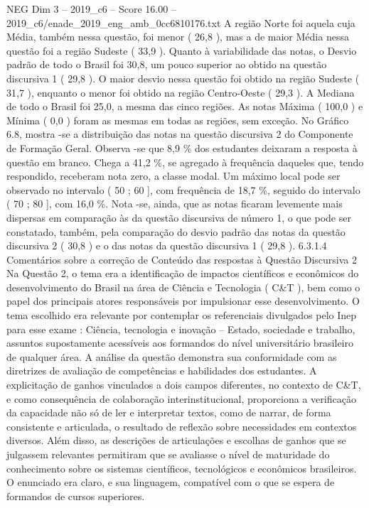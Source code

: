 \begin{textsample}{NEG Dim 3 – 2019\_c6 – Score 16.00 – 2019\_c6/enade\_2019\_eng\_amb\_0cc6810176.txt}
A região Norte foi aquela cuja Média, também nessa questão, foi menor ( 26,8 ), mas a de maior Média nessa questão foi a região Sudeste ( 33,9 ).
Quanto à variabilidade das notas, o Desvio padrão de todo o Brasil foi 30,8, um pouco superior ao obtido na questão discursiva 1 ( 29,8 ).
O maior desvio nessa questão foi obtido na região Sudeste ( 31,7 ), enquanto o menor foi obtido na região Centro-Oeste ( 29,3 ).
A Mediana de todo o Brasil foi 25,0, a mesma das cinco regiões.
As notas Máxima ( 100,0 ) e Mínima ( 0,0 ) foram as mesmas em todas as regiões, sem exceção.
No Gráfico 6.8, mostra -se a distribuição das notas na questão discursiva 2 do Componente de Formação Geral.
Observa -se que 8,9 \% dos estudantes deixaram a resposta à questão em branco.
Chega a 41,2 \%, se agregado à frequência daqueles que, tendo respondido, receberam nota zero, a classe modal.
Um máximo local pode ser observado no intervalo ( 50 ; 60 ], com frequência de 18,7 \%, seguido do intervalo ( 70 ; 80 ], com 16,0 \%.
Nota -se, ainda, que as notas ficaram levemente mais dispersas em comparação às da questão discursiva de número 1, o que pode ser constatado, também, pela comparação do desvio padrão das notas da questão discursiva 2 ( 30,8 ) e o das notas da questão discursiva 1 ( 29,8 ). 6.3.1.4 Comentários sobre a correção de Conteúdo das respostas à Questão Discursiva 2 Na Questão 2, o tema era a identificação de impactos científicos e econômicos do desenvolvimento do Brasil na área de Ciência e Tecnologia ( C\&T ), bem como o papel dos principais atores responsáveis por impulsionar esse desenvolvimento.
O tema escolhido era relevante por contemplar os referenciais divulgados pelo Inep para esse exame : Ciência, tecnologia e inovação – Estado, sociedade e trabalho, assuntos supostamente acessíveis aos formandos do nível universitário brasileiro de qualquer área.
A análise da questão demonstra sua conformidade com as diretrizes de avaliação de competências e habilidades dos estudantes.
A explicitação de ganhos vinculados a dois campos diferentes, no contexto de C\&T, e como consequência de colaboração interinstitucional, proporciona a verificação da capacidade não só de ler e interpretar textos, como de narrar, de forma consistente e articulada, o resultado de reflexão sobre necessidades em contextos diversos.
Além disso, as descrições de articulações e escolhas de ganhos que se julgassem relevantes permitiram que se avaliasse o nível de maturidade do conhecimento sobre os sistemas científicos, tecnológicos e econômicos brasileiros.
O enunciado era claro, e sua linguagem, compatível com o que se espera de formandos de cursos superiores.

\end{textsample}

